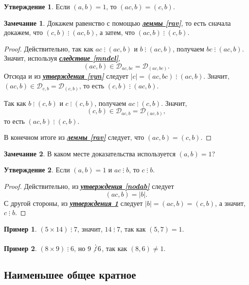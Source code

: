 \documentclass[14pt, a4paper]{extarticle}
\theoremstyle{definition}
\newtheorem*{remark}{Замечание}
\newtheorem{example}{Пример}
\newtheorem{statement}{Утверждение}
\newcommand{\divisible}{\mathop{\vdots}}
\begin{document}
	\begin{statement}
	\label{vzpr}
		Если $(a,b)=1$, то $(ac,b)=(c,b)$.
	\end{statement}
	\begin{remark}
		Докажем равенство с помощью \hyperref[rav]{\textbf{\textit{леммы \ref*{rav}}}}, то есть сначала докажем, что $(c,b)\divisible(ac,b)$, а затем, что $(ac,b)\divisible(c,b)$.
	\end{remark}
	\begin{proof}
		Действительно, так как $ac\divisible(ac,b)$ и $b\divisible(ac,b)$, получаем $bc\divisible(ac,b)$. Значит, используя \hyperref[mndel]{\textbf{\textit{следствие \ref*{mndel}}}}, $$(ac,b)\in\mathcal{D}_{ac,bc}=\mathcal{D}_{(ac,bc)}.$$ Отсюда и из \hyperref[vyn]{\textbf{\textit{утверждения \ref*{vyn}}}} следует $|c|=(ac,bc)\divisible(ac,b)$. Значит, $(ac,b)\in\mathcal{D}_{c,b}=\mathcal{D}_{(c,b)}$, то есть $(c,b)\divisible(ac,b)$.
		
		Так как $b\divisible(c,b)$ и $c\divisible(c,b)$, получаем $ac\divisible(c,b)$. Значит, $$(c,b)\in\mathcal{D}_{ac,b}=\mathcal{D}_{(ac,b)},$$ то есть $(ac,b)\divisible(c,b)$.
		
		В конечном итоге из \hyperref[rav]{\textbf{\textit{леммы \ref*{rav}}}} следует, что $(ac,b)=(c,b)$.
	\end{proof}
	\begin{remark}
		В каком месте доказательства используется $(a,b)=1$?
	\end{remark}

	\begin{statement}
	\label{divpr}
		Если $(a,b)=1$ и $ac\divisible b$, то $c\divisible b$.
	\end{statement}
	\begin{proof}
		Действительно, из \hyperref[nodab]{\textbf{\textit{утверждения \ref*{nodab}}}} следует $$(ac,b)=|b|.$$ С другой стороны, из \hyperref[vzpr]{\textbf{\textit{утверждения \ref*{vzpr}}}} следует $|b|=(ac,b)=(c,b)$, а значит, $c\divisible b$.
	\end{proof}

	\begin{example}
		$(5\times14)\divisible7$, значит, $14\divisible7$, так как $(5,7)=1$.
	\end{example}
	\begin{example}
		$(8\times9)\divisible 6$, но $9\not\divisible6$, так как $(8,6)\neq1$.
	\end{example}

\subsection{Наименьшее общее кратное}
\label{nok}
	
\end{document}
